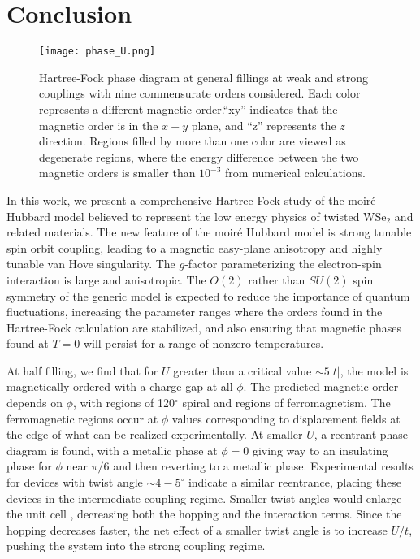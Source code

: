 \documentclass[%
reprint,
superscriptaddress,
twocolumn,
 amsmath,amssymb,
 aps,
 prb,
]{revtex4-2}
\newcommand{\jz}[1]{{\color{Purple}[\textbf{Jiawei: }\textit{{#1}}]}}
\newcommand{\twsetwo}{tWSe$_2$}
\begin{document}


\section{Conclusion}\label{sec:summary}
\begin{figure}[ht]
  \texttt{[image: phase\_U.png]}
  \caption{Hartree-Fock phase diagram at general fillings at weak and strong couplings with nine commensurate orders considered. Each color represents a different magnetic order.``xy'' indicates that the magnetic order is in the $x-y$ plane, and ``z'' represents the $z$ direction. Regions filled by more than one color are viewed as degenerate regions, where the energy difference between the two magnetic orders is smaller than $10^{-3}$ from numerical calculations. }
  \label{fig:phase_U}
\end{figure}


In this work, we present a comprehensive Hartree-Fock study of the moir\'e Hubbard model believed to represent the low energy physics of twisted WSe$_2$ and related materials. The new feature of the moir\'e Hubbard model is strong tunable spin orbit coupling, leading to a magnetic easy-plane anisotropy and highly tunable  van Hove singularity. The $g$-factor parameterizing the electron-spin interaction is large and anisotropic. The $O(2)$ rather than $SU(2)$ spin symmetry of the generic model is expected to reduce the importance of quantum fluctuations, increasing the parameter ranges where the orders found in the Hartree-Fock calculation are stabilized, and also ensuring that magnetic phases found at $T=0$ will persist for a range of nonzero temperatures.

At half filling, we find that for $U$ greater than a critical value $\sim 5|t|$, the model is magnetically ordered with a charge gap at all $\phi$. The predicted magnetic order depends on $\phi$, with regions of 120$^\circ$ spiral and regions of ferromagnetism. The ferromagnetic regions occur at $\phi$ values corresponding to displacement fields at the edge of what can be realized experimentally.  At smaller $U$, a reentrant phase diagram is found, with a metallic phase at $\phi=0$ giving way to an insulating phase for $\phi$ near $\pi/6$ and then reverting to a metallic phase. Experimental results for devices with twist angle $\sim4-5^\circ$ indicate a similar reentrance, placing these devices in the intermediate coupling regime.  Smaller twist angles would enlarge the unit cell \cite{PhysRevResearch.2.033087}, decreasing both the hopping and the interaction terms. Since the hopping decreases faster, the net effect of a smaller twist angle is to increase $U/t$, pushing the system into the strong coupling regime. 
\end{document}
